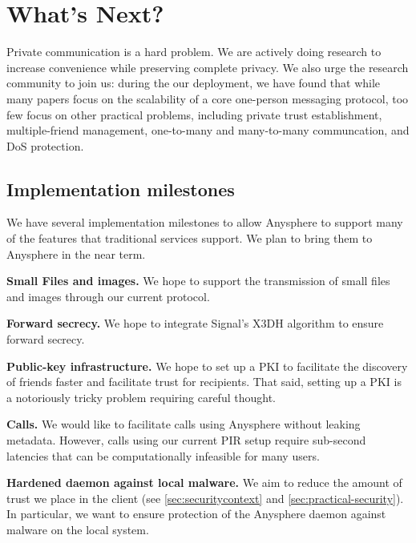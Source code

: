 \section{What's Next?}
\label{sec:future}

Private communication is a hard problem. We are actively doing research to increase convenience while preserving complete privacy. We also urge the research community to join us: during the our deployment, we have found that while many papers focus on the scalability of a core one-person messaging protocol, too few focus on other practical problems, including private trust establishment, multiple-friend management, one-to-many and many-to-many communcation, and DoS protection.


\subsection{Implementation milestones}
We have several implementation milestones to allow Anysphere to support many of the features that traditional services support. We plan to bring them to Anysphere in the near term.

\textbf{Small Files and images.} We hope to support the transmission of small files and images through our current protocol.

\textbf{Forward secrecy.} We hope to integrate Signal's X3DH algorithm to ensure forward secrecy.

\textbf{Public-key infrastructure.} We hope to set up a PKI to facilitate the discovery of friends faster and facilitate trust for recipients. That said, setting up a PKI is a notoriously tricky problem requiring careful thought.

\textbf{Calls.} We would like to facilitate calls using Anysphere without leaking metadata. However, calls using our current PIR setup require sub-second latencies that can be computationally infeasible for many users.


\textbf{Hardened daemon against local malware.} We aim to reduce the amount of trust we place in the client (see \cref{sec:securitycontext} and \cref{sec:practical-security}). In particular, we want to ensure protection of the Anysphere daemon against malware on the local system.


